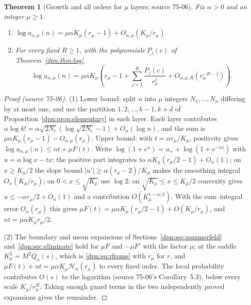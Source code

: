 \documentclass[11pt]{article}
\numberwithin{equation}{section}
\newtheorem{theorem}{Theorem}[section]
\theoremstyle{definition}\newtheorem{definition}[theorem]{Definition}
\theoremstyle{remark}\newtheorem{remark}[theorem]{Remark}
\newcommand{\asym}{\mathscr H_{\alpha}}
\newcommand{\src}[1]{\textup{(source #1)}}
\begin{document}
\begin{theorem}[Growth and all orders for $\mu$ layers; source 75-06]\label{dpn:cp:thm:log}
Fix $\alpha>0$ and an integer $\mu\ge1$.
\begin{enumerate}
\item $\log a_{\alpha,\mu}(n)=\mu\alpha K_\mu(r_\mu-1)+O_{\alpha,\mu}(K_\mu/r_\mu)$.
\item For every fixed $R\ge1$, with the polynomials $P_j(c)$ of
  Theorem~\ref{dpn:thm:log},
  \begin{equation}\label{dpn:cp:eq:logall}
  \log a_{\alpha,\mu}(n)=\mu\alpha K_\mu\left(r_\mu-1+\sum_{j=1}^R\frac{P_j(c)}{r_\mu^j}
  +O_{\alpha,\mu,R}(r_\mu^{-R-1})\right).
  \end{equation}
\end{enumerate}
\end{theorem}
\begin{proof}[Proof \src{75-06}]
(1) Lower bound: split $n$ into $\mu$ integers $N_1,\dots,N_\mu$ differing by
at most one, and use the partition $1,2,\dots,k-1,k+d$ of
Proposition~\ref{dpn:prop:elementary} in each layer.  Each layer contributes
$\alpha\log k!=\alpha\sqrt{2N_i}(\log\sqrt{2N_i}-1)+O_\alpha(\log n)$, and the
sum is $\mu\alpha K_\mu(r_\mu-1)-O_{\alpha,\mu}(r_\mu)$.  Upper bound: with
$t=\alpha r_\mu/K_\mu$, positivity gives $\log a_{\alpha,\mu}(n)\le nt+\mu F(t)$.
Write $\log(1+e^u)=u_++\log(1+e^{-|u|})$ with $u=\alpha\log x-tx$: the
positive part integrates to $\alpha K_\mu(r_\mu/2-1)+O_\alpha(1)$; on
$x\ge K_\mu/2$ the slope bound $|u'|\ge\alpha(r_\mu-2)/K_\mu$ makes the
smoothing integral $O_\alpha(K_\mu/r_\mu)$; on $0<x\le\sqrt{K_\mu}$ use
$\log2$; on $\sqrt{K_\mu}\le x\le K_\mu/2$ convexity gives
$u\le-\alpha r_\mu/2+O_\alpha(1)$ and a contribution $O(K_\mu^{1-\alpha/2})$.
With the sum--integral error $O_\alpha(r_\mu)$ this gives
$\mu F(t)=\mu\alpha K_\mu(r_\mu/2-1)+O(K_\mu/r_\mu)$, and $nt=\mu\alpha
K_\mu r_\mu/2$.

(2) The boundary and mean expansions of Sections~\ref{dpn:sec:sommerfeld}
and~\ref{dpn:sec:eliminate} hold for $\mu F$ and $-\mu F'$ with the factor
$\mu$; at the saddle $K_\mu^2=M^2Q_\alpha(s)$, which is \eqref{dpn:eq:rfroms}
with $r_\mu$ for $r$, and $\mu F(t)+nt=\mu\alpha K_\mu\asym(r_\mu)$ to every
fixed order.  The local probability contributes $O(s)$ to the logarithm
(source 75-06's Corollary~5.3), below every scale $K_\mu/r_\mu^R$.  Taking
enough guard terms in the two independently proved expansions gives the
remainder.
\end{proof}
\end{document}
